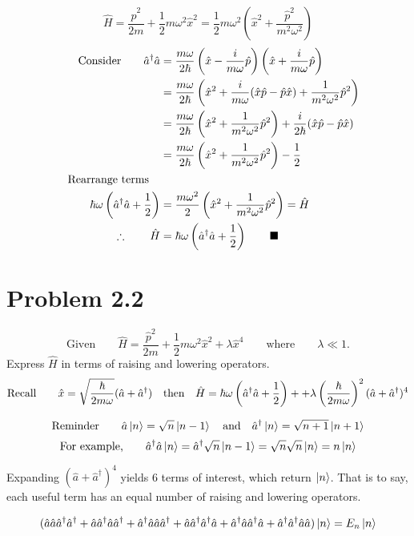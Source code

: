 \documentclass{amsart}
\begin{document}
\pagebreak


\[\hat{H}=\frac{\hat{p}^2}{2m}+\frac{1}{2}m\omega^2\hat{x}^2=\frac{1}{2}m\omega^2\left(\hat{x}^2+\frac{\hat{p}^2}{m^2\omega^2}\right) \]
\begin{align*}
    \text{Consider}\qquad \hat{a}^\dagger \hat{a} &=\frac{m\omega}{2\hbar}\left(\hat{x} - \frac{i}{m\omega}\hat{p}\right)\left(\hat{x} + \frac{i}{m\omega}\hat{p}\right)\\
    &=\frac{m\omega}{2\hbar}\left(\hat{x}^2 + \frac{i}{m\omega}(\hat{x}\hat{p}-\hat{p}\hat{x}) + \frac{1}{m^2\omega^2}\hat{p}^2\right)\\
    &=\frac{m\omega}{2\hbar}\left(\hat{x}^2 + \frac{1}{m^2\omega^2}\hat{p}^2\right) + \frac{i}{2\hbar}(\hat{x}\hat{p}-\hat{p}\hat{x})\\
    &=\frac{m\omega}{2\hbar}\left(\hat{x}^2 + \frac{1}{m^2\omega^2}\hat{p}^2\right) - \frac{1}{2}\\
    \qq{Rearrange terms}\\
    \hbar\omega\left(\hat{a}^\dagger \hat{a} +\frac{1}{2}\right)&=\frac{m\omega^2}{2}\left(\hat{x}^2 + \frac{1}{m^2\omega^2}\hat{p}^2\right)= \hat{H}\\
    \therefore\qquad\hat{H}&=\hbar\omega\left(\hat{a}^\dagger \hat{a} +\frac{1}{2}\right)\qquad\blacksquare
\end{align*}

\section*{Problem 2.2}
\[\text{Given}\qquad\hat{H}=\frac{\hat{p}^2}{2m}+\frac{1}{2}m\omega^2\hat{x}^2+\lambda\hat{x}^4\qquad\text{where}\qquad \lambda\ll 1. \]
Express $\hat{H}$ in terms of raising and lowering operators.
\[\text{Recall}\qquad\hat{x}=\sqrt{\frac{\hbar}{2m\omega}}(\hat{a}+\hat{a}^\dagger)\qq{then}\hat{H}=\hbar\omega\left(\hat{a}^\dagger \hat{a} +\frac{1}{2}\right)++\lambda\left(\frac{\hbar}{2m\omega}\right)^2(\hat{a}+\hat{a}^\dagger)^4   \]

\[\text{Reminder}\qquad\hat{a}\ket{n} =\sqrt{n}\ket{n-1} \qq{and} \hat{a}^\dagger\ket{n} =\sqrt{n+1}\ket{n+1}  \]
\[\text{For example,}\qquad\hat{a}^\dagger\hat{a}\ket{n} =\hat{a}^\dagger\sqrt{n}\ket{n-1}=\sqrt{n}\sqrt{n}\ket{n}=n\ket{n} \]

Expanding $(\hat{a}+\hat{a}^\dagger)^4$ yields 6 terms of interest, which return $\ket{n}$. That is to say, each useful term has an equal number of raising and lowering operators.

\[(\hat{a}\hat{a}\hat{a}^\dagger\hat{a}^\dagger+\hat{a}\hat{a}^\dagger\hat{a}\hat{a}^\dagger+\hat{a}^\dagger\hat{a}\hat{a}\hat{a}^\dagger+\hat{a}\hat{a}^\dagger\hat{a}^\dagger\hat{a}+\hat{a}^\dagger\hat{a}\hat{a}^\dagger\hat{a}+\hat{a}^\dagger\hat{a}^\dagger\hat{a}\hat{a})\ket{n}=E_n\ket{n}\]
\end{document}
